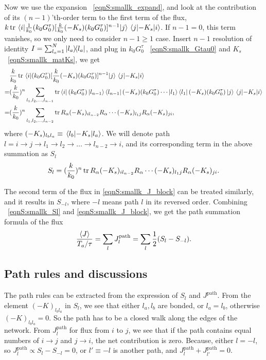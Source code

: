 \documentclass[
 amsmath,amssymb,
 aps,
 pre,
 longbibliography,
 10pt, onecolumn,
 notitlepage
]{revtex4-1}
\begin{document}
Now we use the expansion \eqnname~\eqref{eqnS:smallk_expand}, and look at the contribution of its $(n-1)$'th-order term to the first term of the flux, $k \tr \mel{i}{\frac{1}{k_0} (k_0 G^\tau_0) [\frac{k}{k_0}(-K_s)(k_0 G^\tau_0)]^{n-1}}{j} \mel{j}{-K_s}{i}$.
If $n-1=0$, this term vanishes, so we only need to consider $n-1 \ge 1$ case.
Insert $n-1$ resolution of identity $I = \sum_{l_a=1}^N \ketbra{l_a}{l_a}$, and plug in $k_0 G^\tau_0$ \eqnname~\eqref{eqnS:smallk_Gtau0} and $K_s$ \eqnname~\eqref{eqnS:smallk_matKs}, we get
\begin{equation}
    \begin{split}
    &\frac{k}{k_0} \tr \mel{i}{(k_0 G^\tau_0) [\frac{k}{k_0}(-K_s)(k_0 G^\tau_0)]^{n-1}}{j} \mel{j}{-K_s}{i} \\
    =& (\frac{k}{k_0})^n \sum_{l_1,l_2,\dots,l_{n-1}} \tr \bra{i} (k_0G^\tau_0) \ket{l_{n-1}}\bra{l_{n-1}} (-K_s) (k_0G^\tau_0) \cdots \ket{l_1}\bra{l_1} (-K_s) (k_0G^\tau_0) \ket{j} \mel{j}{-K_s}{i}\\
    =& (\frac{k}{k_0})^n \sum_{l_1,l_2,\dots,l_{n-2}} \tr R_\alpha (-K_s)_{il_{n-2}} R_\alpha \cdots (-K_s)_{l_1j} R_\alpha (-K_s)_{ji},
    \end{split}
\end{equation}
where $(-K_s)_{l_bl_a} \equiv \mel{l_b}{-K_s}{l_a}$.
We will denote path $l = i\rightarrow j\rightarrow l_1\rightarrow l_2\rightarrow \dots \rightarrow l_{n-2}\rightarrow i$, and its corresponding term in the above summation as $S_l$
\begin{equation} \label{eqnS:smallk_Sl}
    S_l = (\frac{k}{k_0})^n \tr R_\alpha (-K_s)_{il_{n-2}} R_\alpha \cdots (-K_s)_{l_1j} R_\alpha (-K_s)_{ji}.
\end{equation}

The second term of the flux in \eqref{eqnS:smallk_J_block} can be treated similarly, and it results in $S_{-l}$, where $-l$ means path $l$ in its reversed order.
Combining \eqnname~\eqref{eqnS:smallk_Sl} and \eqref{eqnS:smallk_J_block}, we get the path summation formula of the flux
\begin{equation} \label{eqnS:smallk_path_sum}
    \frac{\expval{J}}{T_a/\tau} = \sum_l J^\text{path}_l
    = \sum_l \frac{1}{2}(S_l - S_{-l}).
\end{equation}

\subsection{Path rules and discussions}
The path rules can be extracted from the expression of $S_l$ and $J^\text{path}$.
From the element $(-K)_{l_bl_a}$ in $S_l$, we see that either $l_a,l_b$ are bonded, or $l_a=l_b$, otherwise $(-K)_{l_bl_a}=0$.
So the path has to be a closed walk along the edges of the network.
From $J^\text{path}_l$ for flux from $i$ to $j$, we see that if the path contains equal numbers of $i\rightarrow j$ and $j\rightarrow i$, the net contribution is zero. Because, either $l=-l$, so $J^\text{path}_l \propto S_l - S_{-l} = 0$, or $l'\equiv -l$ is another path, and $J^\text{path}_l + J^\text{path}_{l'} = 0$.
\end{document}
